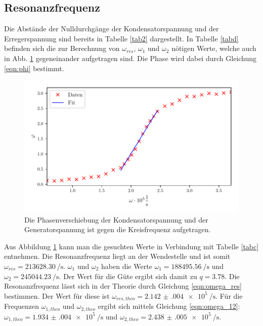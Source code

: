\subsection{Resonanzfrequenz} %
Die Abstände der Nulldurchgänge der Kondensatorspannung und
der Erregerspannung sind bereits in Tabelle \ref{tab2}
dargestellt. In Tabelle \ref{tabd} befinden sich die
zur Berechnung von $\omega_{res}$, $\omega_{1}$ und $\omega_{2}$
nötigen Werte, welche auch in Abb. \ref{fig:plotd} gegeneinander
aufgetragen sind. Die Phase wird dabei durch Gleichung \eqref{eqn:phi}
bestimmt.

\begin{figure}
  \centering
  \includegraphics{build/plotd.pdf}
  \caption{Die Phasenverschiebung der Kondensatorspannung und der
  Generatorspannung ist gegen die Kreisfrequenz aufgetragen.}
  \label{fig:plotd}
\end{figure}
\noindent Aus Abbildung \ref{fig:plotd} kann man die gesuchten Werte in Verbindung mit Tabelle
\ref{tabc} entnehmen.
Die Resonanzfrequenz liegt an der Wendestelle und ist somit
 $\omega_{res} = \SI[per-mode=fraction]{213628.30}{\per\second}$.
$\omega_{1}$ und $\omega_{2}$ haben die Werte
$\omega_{1} = \SI[per-mode=fraction]{188495.56}{\per\second}$ und
$\omega_{2} = \SI[per-mode=fraction]{245044.23}{\per\second}$.
\newline
\noindent Der Wert für die Güte ergibt sich damit zu $q = \num{3.78}$.
Die Resonanzfrequenz lässt sich in der Theorie durch 
Gleichung \eqref{eqn:omega_res} bestimmen.
Der Wert für diese ist $\omega_{res,theo} = \SI[per-mode=fraction]{2.142(004)e5}{\per\second}$.
Für die Frequenzen $\omega_{1,theo}$ und $\omega_{2,theo}$ ergibt sich
mittels Gleichung \eqref{eqn:omega_12}:
$\omega_{1,theo} = \SI[per-mode=fraction]{1.934(004)e5}{\per\second}$ und
$\omega_{2,theo} = \SI[per-mode=fraction]{2.438(005)e5}{\per\second}$.

